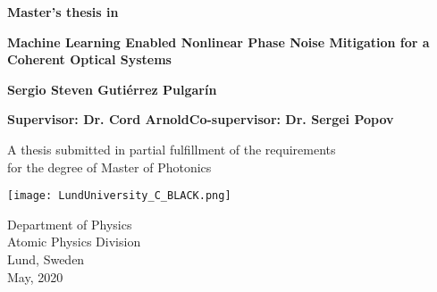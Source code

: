 
\setcounter{page}{1}

\newpage



\thispagestyle{empty}
\begin{center}
   \vspace*{1cm}
  {\large \textbf{Master's thesis in  }}

  \vspace*{0.5cm}
  {\LARGE \bf\noindent \textbf{Machine Learning Enabled Nonlinear Phase Noise Mitigation for a Coherent Optical Systems  }}

  \vspace*{1cm}
  {\large\bf Sergio Steven Guti\'errez Pulgar\'in}
  
  \vspace*{0.30cm}
	{\normalsize \bf Supervisor: Dr. Cord Arnold\hfill   Co-supervisor: Dr. Sergei Popov}
	
  \vfill

  {\large A thesis submitted in partial fulfillment of the requirements\\
  [1mm] for the degree of Master of Photonics}
  \vspace*{0.9cm}
  
   \texttt{[image: LundUniversity\_C\_BLACK.png]}

  {\large Department of Physics \\
          [-1mm] Atomic Physics Division\\
          [-1mm] Lund, Sweden\\
          [1mm]  May, 2020}
%          
%	
%	


\end{center}

